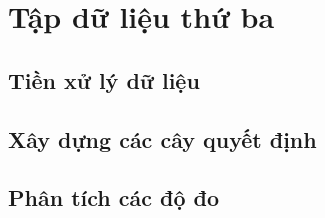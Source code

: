 \section{Tập dữ liệu thứ ba}
\subsection{Tiền xử lý dữ liệu}
\subsection{Xây dựng các cây quyết định}
\subsection{Phân tích các độ đo}